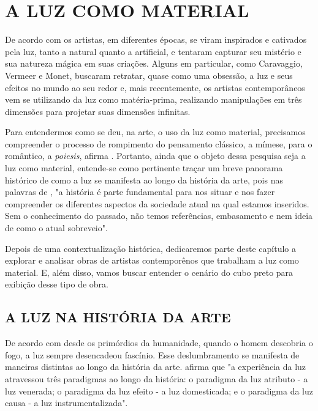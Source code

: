 \chapter{A LUZ COMO MATERIAL}

De acordo com  os artistas, em diferentes épocas, se viram inspirados e cativados pela luz, tanto a natural quanto a artificial, e tentaram capturar seu mistério e sua natureza mágica em suas criações. Alguns em particular, como Caravaggio, Vermeer e Monet, buscaram retratar, quase como uma obsessão, a luz e seus efeitos no mundo ao seu redor e, mais recentemente, os artistas contemporâneos vem se utilizando da luz como matéria-prima, realizando manipulações em três dimensões para projetar suas dimensões infinitas. 

Para entendermos como se deu, na arte, o uso da luz como material, precisamos compreender o processo de rompimento do pensamento clássico, a mímese, para o romântico, a \textit{poiesis}, afirma . Portanto, ainda que o objeto dessa pesquisa seja a luz como material, entende-se como pertinente traçar um breve panorama histórico de como a luz se manifesta ao longo da história da arte, pois nas palavras de , "a história é parte fundamental para nos situar e nos fazer compreender os diferentes aspectos da sociedade atual na qual estamos inseridos. Sem o conhecimento do passado, não temos referências, embasamento e nem ideia de como o atual sobreveio". 

Depois de uma contextualização histórica, dedicaremos parte deste capítulo a explorar e analisar obras de artistas contemporênos que trabalham a luz como material. E, além disso, vamos buscar entender o cenário do cubo preto para exibição desse tipo de obra.


\section{A LUZ NA HISTÓRIA DA ARTE}

De acordo com   desde os primórdios da humanidade, quando o homem descobria o fogo, a luz sempre desencadeou fascínio. Esse deslumbramento se manifesta de maneiras distintas ao longo da história da arte.  afirma que "a experiência da luz atravessou três paradigmas ao longo da história: o paradigma da luz atributo - a luz venerada; o paradigma da luz efeito - a luz domesticada; e o paradigma da luz causa - a luz instrumentalizada".

